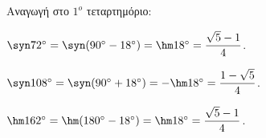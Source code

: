 Αναγωγή στο $1^o$ τεταρτημόριο:
\begin{alist}
\item $\syn  72^\circ = \syn (90^\circ - 18^\circ) = \hm  18^\circ = \dfrac{\sqrt{5} - 1}{4}$.
\item $\syn  108^\circ = \syn (90^\circ + 18^\circ) = -\hm  18^\circ = \dfrac{1 - \sqrt{5}}{4}$.
\item $\hm  162^\circ = \hm (180^\circ - 18^\circ) = \hm  18^\circ = \dfrac{\sqrt{5} - 1}{4}$.
\end{alist}

